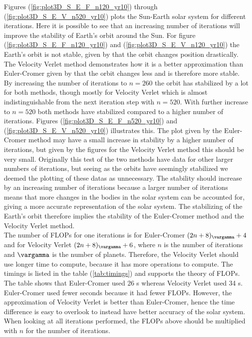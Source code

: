\documentclass{article}
\begin{document}
    Figures (\ref{fig:plot3D_S_E_F_n120_yr10}) through (\ref{fig:plot3D_S_E_V_n520_yr10}) plots the Sun-Earth solar system for different iterations. Here it is possible to see that an increasing number of iterations will improve the stability of Earth's orbit around the Sun.
    For figure (\ref{fig:plot3D_S_E_F_n120_yr10}) and (\ref{fig:plot3D_S_E_V_n120_yr10}) the Earth's orbit is not stable, given by that the orbit changes position drastically. The Velocity Verlet method demonstrates how it is a better approximation than Euler-Cromer given by that the orbit changes less and is therefore more stable. By increasing the number of iterations to $n = 260$ the orbit has stabilized by a lot for both methods, though mostly for Velocity Verlet which is almost indistinguishable from the next iteration step with $n = 520$. With further increase to $n = 520$ both methods have stabilized compared to a higher number of iterations.
    Figures (\ref{fig:plot3D_S_E_F_n520_yr10}) and (\ref{fig:plot3D_S_E_V_n520_yr10}) illustrates this. The plot given by the Euler-Cromer method may have a small increase in stability by a higher number of iterations, but given by the figures for the Velocity Verlet method this should be very small. Originally this test of the two methods have data for other larger numbers of iterations, but seeing as the orbits have seemingly stabilized we deemed the plotting of these datas as unnecessary.
    The stability should increase by an increasing number of iterations because a larger number of iterations means that more changes in the bodies in the solar system can be accounted for, giving a more accurate representation of the solar system. The stabilizing of the Earth's orbit therefore implies the stability of the Euler-Cromer method and the Velocity Verlet method. \\

    The number of FLOPs for one iterations is for Euler-Cromer $(2n + 8)_\vargamma + 4$ and for Velocity Verlet $(2n + 8)_\vargamma + 6$, where $n$ is the number of iterations and $\vargamma$ is the number of planets. Therefore, the Velocity Verlet should use longer time to compute, because it has more operations to compute. The timings is listed in the table (\ref{tab:timings}) and supports the theory of FLOPs. The table shows that Euler-Cromer used 26 s whereas Velocity Verlet used 34 s. Euler-Cromer used fewer seconds because it had fewer FLOPs. However, the approximation of Velocity Verlet is better than Euler-Cromer, hence the time difference is easy to overlook to instead have better accuracy of the solar system. When looking at all iterations performed, the FLOPs above should be multiplied with $n$ for the number of iterations. \\
\end{document}
